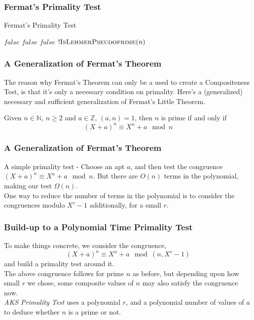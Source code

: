 \documentclass{beamer}
\begin{document}
\begin{frame}
\frametitle{Fermat's Primality Test}
\begin{algorithm}[H]
\caption{Fermat's Primality Test}
\label{alg:FermatPrimalityTest}
\begin{algorithmic}
	\State \Return $false$ 
\EndIf
{}
		\State \Return $false$ 
	\EndIf
\EndFor
{}
	\State \Return $false$ 
\EndIf
\State \Return $!\Call{IsLehmerPseudoprime}{n}$ 
\EndProcedure
\end{algorithmic}
\end{algorithm}

\end{frame}

\begin{frame}
\frametitle{A Generalization of Fermat's Theorem}
The reason why Fermat's Theorem can only be a used to create a Compositeness Test, is that it's only a necessary condition on primality. Here's a (generalized) necessary and sufficient generalization of Fermat's Little Theorem.
\\[3mm]
\begin{theorem}
\label{theorem:GeneralisedFermatLittleTheorem}
Given $n \in \mathbb{N}$, $n \geq 2$ and $a \in \mathbb{Z}$, $(a,n) = 1$, then $n$ is prime if and only if
\[ (X+a)^n \equiv X^n + a \mod n \]
\end{theorem}
\end{frame}

\begin{frame}
\frametitle{A Generalization of Fermat's Theorem}
A simple primality test - Choose an apt $a$, and then test the congruence $(X+a)^n \equiv X^n + a \mod n$. But there are $O(n)$ terms in the polynomial, making our test $\Omega(n)$.
\\[3mm]
One way to reduce the number of terms in the polynomial is to consider the congruences modulo $X^r-1$ additionally, for a small $r$.
\end{frame}

\begin{frame}
\frametitle{Build-up to a Polynomial Time Primality Test}
To make things concrete, we consider the congruence,
\[(X+a)^n \equiv X^n+a \mod (n, X^r-1)\]
and build a primality test around it.
\\[3mm]
The above congruence follows for prime $n$ as before, but depending upon how small $r$ we chose, some composite values of $n$ may also satisfy the congruence now.
\\[3mm]
\emph{AKS Primality Test} uses a polynomial $r$, and a polynomial number of values of $a$ to deduce whether $n$ is a prime or not. 
\end{frame}
\end{document}
